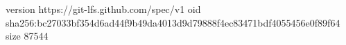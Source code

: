 version https://git-lfs.github.com/spec/v1
oid sha256:bc27033bf354d6ad44f9b49da4013d9d79888f4ec83471bdf4055456e0f89f64
size 87544
